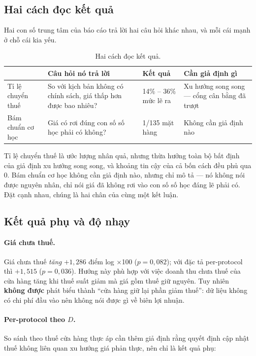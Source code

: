 \documentclass[11pt]{article}
\newcommand{\dvi}{điểm log $\times$100}
\begin{document}
\subsection{Hai cách đọc kết quả}

Hai con số trung tâm của báo cáo trả lời hai câu hỏi khác nhau, và mỗi cái mạnh ở chỗ cái kia yếu.

\begin{table}[htbp]
  \centering
  \caption{Hai cách đọc kết quả.}
  \label{tab:hai-cach-doc}
  \begin{tabular}{p{3.0cm}p{4.6cm}p{2.4cm}p{4.0cm}}
    \toprule
    & Câu hỏi nó trả lời & Kết quả & Cần giả định gì \\
    \midrule
    Tỉ lệ chuyển thuế & So với kịch bản không có chính sách, giá thấp hơn được bao nhiêu?
    & 14\% -- 36\% mức lẽ ra & Xu hướng song song --- cổng cân bằng đã trượt \\
    \addlinespace
    Bám chuẩn cơ học & Giá có rơi đúng con số số học phải có không?
    & 1/135 mặt hàng & Không cần giả định nào \\
    \bottomrule
  \end{tabular}
\end{table}

Tỉ lệ chuyển thuế là ước lượng nhân quả, nhưng thừa hưởng toàn bộ bất định của giả định xu hướng
song song, và khoảng tin cậy của cả bốn cách đều phủ qua 0. Bám chuẩn cơ học không cần giả định
nào, nhưng chỉ mô tả --- nó không nói được nguyên nhân, chỉ nói giá đã không rơi vào con số số học
đáng lẽ phải có. Đặt cạnh nhau, chúng là hai chân của cùng một kết luận.

\subsection{Kết quả phụ và độ nhạy}

\paragraph{Giá chưa thuế.} Giá chưa thuế \emph{tăng} $+1{,}286$ \dvi{} ($p = 0{,}082$); với đặc tả
per-protocol thì $+1{,}515$ ($p = 0{,}036$). Hướng này phù hợp với việc doanh thu chưa thuế của cửa
hàng tăng khi thuế suất giảm mà giá gồm thuế giữ nguyên. Tuy nhiên \textbf{không được} phát biểu
thành ``cửa hàng giữ lại phần giảm thuế'': dữ liệu không có chi phí đầu vào nên không nói được gì
về biên lợi nhuận.

\paragraph{Per-protocol theo $D$.} So sánh theo thuế cửa hàng thực áp cần thêm giả định rằng quyết
định cập nhật thuế không liên quan xu hướng giá phản thực, nên chỉ là kết quả phụ:
\end{document}
